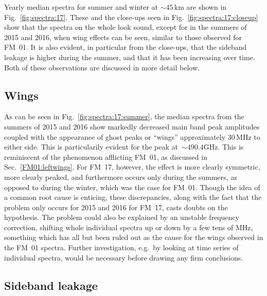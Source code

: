 \noindent
Yearly median spectra for summer and winter at $\sim45\,\mathrm{km}$ are shown
in Fig.~\ref{fig:spectra:17}.  These and the close-ups seen in
Fig.~\ref{fig:spectra:17:closeup} show that the spectra on the whole look sound,
except for in the summers of 2015 and 2016, when wing effects can be seen,
similar to those observed for FM~01.  It is also evident, in particular from
the close-ups, that the sideband leakage is higher during the summer, and that
it has been increasing over time.  Both of these observations are discussed in
more detail below.


\subsection{Wings}
\label{FM17:wings}
As can be seen in Fig.~\ref{fig:spectra:17:summer}, the median spectra from the
summers of 2015 and 2016 show markedly decreased main band peak amplitudes
coupled with the appearance of ghost peaks or ``wings'' approximately
$30\,\mathrm{MHz}$ to either side.  This is particularily evident for the
 peak at~$\sim490.4\mathrm{GHz}$.  This is reminiscent of the
phenomenon afflicting FM~01, as discussed in Sec.~\ref{FM01:leftwings}.  For
FM~17, however, the effect is more clearly symmetric, more clearly peaked, and
furthermore occurs only during the summers, as opposed to during the winter,
which was the case for FM~01.  Though the idea of a common root cause is
enticing, these discrepancies, along with the fact that the problem only occurs
for 2015 and 2016 for FM~17, casts doubts on the hypothesis.  The problem could
also be explained by an unstable frequency correction, shifting whole
individual spectra up or down by a few tens of $\mathrm{MHz}$, something which
has all but been ruled out as the cause for the wings observed in the FM~01
spectra.  Further investigation, e.g.~by looking at time series of individual
spectra, would be necessary before drawing any firm conclusions.


\subsection{Sideband leakage}
\label{FM17:sbl}

